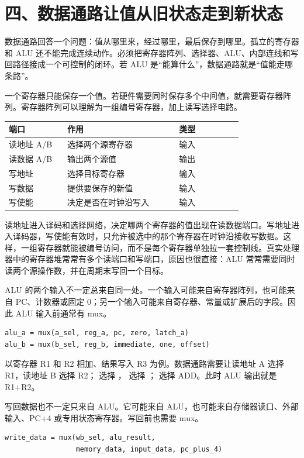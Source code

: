 \section{四、数据通路让值从旧状态走到新状态}

数据通路回答一个问题：值从哪里来，经过哪里，最后保存到哪里。孤立的寄存器和 ALU 还不能完成连续动作。必须把寄存器阵列、选择器、ALU、内部连线和写回路径接成一个可控制的闭环。若 ALU 是“能算什么”，数据通路就是“值能走哪条路”。

一个寄存器只能保存一个值。若硬件需要同时保存多个中间值，就需要寄存器阵列。寄存器阵列可以理解为一组编号寄存器，加上读写选择电路。

\begin{longtable}{L{0.22\linewidth}L{0.42\linewidth}L{0.24\linewidth}}
\toprule
端口 & 作用 & 类型 \\
\midrule
读地址 A/B & 选择两个源寄存器 & 输入 \\
读数据 A/B & 输出两个源值 & 输出 \\
写地址 & 选择目标寄存器 & 输入 \\
写数据 & 提供要保存的新值 & 输入 \\
写使能 & 决定是否在时钟沿写入 & 输入 \\
\bottomrule
\end{longtable}

读地址进入译码和选择网络，决定哪两个寄存器的值出现在读数据端口。写地址进入译码器，写使能有效时，只允许被选中的那个寄存器在时钟沿接收写数据。这样，一组寄存器就能被编号访问，而不是每个寄存器单独拉一套控制线。真实处理器中的寄存器堆常常有多个读端口和写端口，原因也很直接：ALU 常常需要同时读两个源操作数，并在周期末写回一个目标。

ALU 的两个输入不一定总来自同一处。一个输入可能来自寄存器阵列，也可能来自 PC、计数器或固定 0；另一个输入可能来自寄存器、常量或扩展后的字段。因此 ALU 输入前通常有 mux。

\begin{lstlisting}
alu_a = mux(a_sel, reg_a, pc, zero, latch_a)
alu_b = mux(b_sel, reg_b, immediate, one, offset)
\end{lstlisting}

以寄存器 R1 和 R2 相加、结果写入 R3 为例。数据通路需要让读地址 A 选择 R1，读地址 B 选择 R2； 选择 ， 选择 ； 选择 ADD。此时 ALU 输出就是 R1+R2。

写回数据也不一定只来自 ALU。它可能来自 ALU，也可能来自存储器读口、外部输入、PC+4 或专用状态寄存器。写回前也需要 mux。

\begin{lstlisting}
write_data = mux(wb_sel, alu_result,
                 memory_data, input_data, pc_plus_4)
\end{lstlisting}

